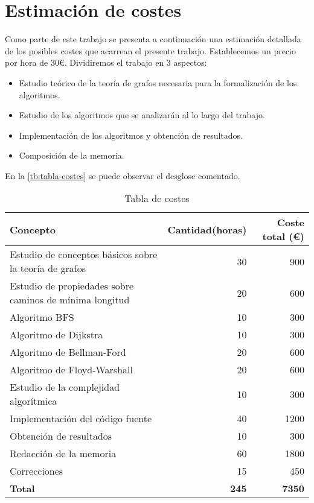 
\chapter{Estimación de costes}\label{ap:apendice4}

Como parte de este trabajo se presenta a continuación una estimación detallada de los posibles costes que acarrean el presente trabajo. Establecemos un precio por hora de $30$€. Dividiremos el trabajo en $3$ aspectos:

\begin{itemize}
	\item Estudio teórico de la teoría de grafos necesaria para la formalización de los algoritmos.
	\item Estudio de los algoritmos que se analizarán al lo largo del trabajo.
	\item Implementación de los algoritmos y obtención de resultados.
	\item Composición de la memoria.
\end{itemize}

En la \autoref{tb:tabla-costes} se puede observar el desglose comentado.

\begin{table}[htpb]
	\centering
	\begin{tabular}{lrr} \toprule
		\textbf{Concepto} & \textbf{Cantidad(horas)} & \textbf{Coste total (€)}          \\ \toprule
		Estudio de conceptos básicos sobre la teoría de grafos & 30 & 900          \\ 
		Estudio de propiedades sobre caminos de mínima longitud & 20 & 600          \\ \bottomrule
		Algoritmo BFS & 10 & 300          \\ 
		Algoritmo de Dijkstra & 10 & 300          \\
		Algoritmo de Bellman-Ford & 20 & 600          \\ 
		Algoritmo de Floyd-Warshall & 20 & 600          \\
		Estudio de la complejidad algorítmica & 10 & 300          \\  \bottomrule
		Implementación del código fuente & 40 & 1200 \\ 
		Obtención de resultados & 10 & 300 \\ \bottomrule
		Redacción de la memoria & 60 & 1800          \\ 
		Correcciones & 15 & 450          \\ \bottomrule
		\textbf{Total} & \textbf{245} & \textbf{7350}          \\ \bottomrule
	\end{tabular}
	\caption{Tabla de costes}
	\label{tb:tabla-costes}
\end{table}

\endinput
